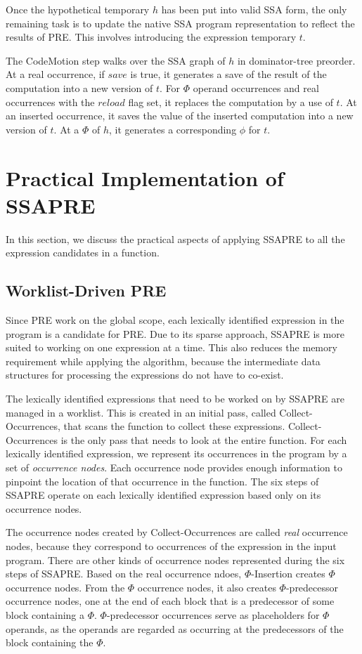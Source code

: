 Once the hypothetical temporary $h$ has been put into valid SSA form, the
only remaining task is to update the native SSA program representation to
reflect the results of PRE.  This involves introducing the expression
temporary $t$.

The CodeMotion step walks over the SSA graph of $h$ in dominator-tree 
preorder.  At a real occurrence, if $save$ is true, it generates a save
of the result of the computation into a new version of $t$.  For $\Phi$
operand occurrences and real occurrences with the $reload$ flag set, it
replaces the computation by a use of $t$.  At an inserted occurrence, it
saves the value of the inserted computation into a new version of $t$.
At a $\Phi$ of $h$, it generates a corresponding $\phi$ for $t$.

\section{Practical Implementation of SSAPRE}

In this section, we discuss the practical aspects of applying SSAPRE to 
all the expression candidates in a function.

\subsection{Worklist-Driven PRE}

Since PRE work on the global scope, each lexically identified expression in
the program is a candidate for PRE.  Due to its sparse approach, SSAPRE 
is more suited to working on one expression at a time.   This also reduces
the memory requirement while applying the algorithm, because the intermediate
data structures for processing the expressions do not have to co-exist.

The lexically identified expressions that need to be worked on by SSAPRE
are managed in a worklist.  This is created in an initial pass, called
Collect-Occurrences, that scans the function to collect these expressions.
Collect-Occurrences is the only pass that needs to look at the entire
function.  For each lexically identified expression, we represent its
occurrences in the program by a set of \emph{occurrence nodes}.  Each
occurrence node provides enough information to pinpoint the location of that
occurrence in the function.  The six steps of SSAPRE operate on each
lexically identified expression based only on its occurrence nodes.

The occurrence nodes created by Collect-Occurrences are called \emph{real}
occurrence nodes, because they correspond to occurrences of the expression in
the input program.  There are other kinds of occurrence nodes represented
during the six steps of SSAPRE.  Based on the real occurrence ndoes,
$\Phi$-Insertion creates $\Phi$ occurrence nodes.  From the $\Phi$ occurrence
nodes, it also creates $\Phi$-predecessor occurrence nodes, one at the end
of each block that is a predecessor of some block containing a $\Phi$.
$\Phi$-predecessor occurrences serve as placeholders for $\Phi$ operands, as
the operands are regarded as occurring at the predecessors of the block
containing the $\Phi$.

